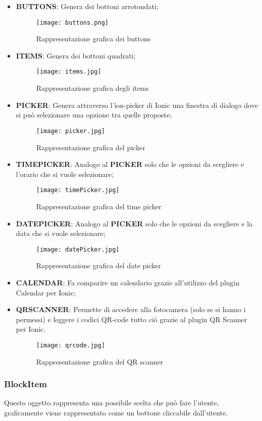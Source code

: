 \begin{itemize}
	\item \textbf{BUTTONS}: Genera dei bottoni arrotondati;
	\begin{figure}[h]
		\centering
		\texttt{[image: buttons.png]}
	\caption{Rappresentazione grafica dei buttons}
	\end{figure}
	\clearpage
	\item \textbf{ITEMS}: Genera dei bottoni quadrati;
	\begin{figure}[h]
		\centering
		\texttt{[image: items.jpg]}
		\caption{Rappresentazione grafica degli items}
	\end{figure}
	\item \textbf{PICKER}: Genera attraverso l'ion-picker di \textsf{Ionic} una finestra di dialogo dove si può selezionare una opzione tra quelle proposte;
	\begin{figure}[h]
		\centering
		\texttt{[image: picker.jpg]}
		\caption{Rappresentazione grafica del picker}
	\end{figure}
	\item \textbf{TIMEPICKER}: Analogo al \textbf{PICKER} solo che le opzioni da scegliere e l'orario che si vuole selezionare;
	\begin{figure}[h]
		\centering
		\texttt{[image: timePicker.jpg]}
		\caption{Rappresentazione grafica del time picker}
	\end{figure}
\clearpage
	\item \textbf{DATEPICKER}: Analogo al \textbf{PICKER} solo che le opzioni da scegliere e la data che si vuole selezionare;
	\begin{figure}[h]
		\centering
		\texttt{[image: datePicker.jpg]}
		\caption{Rappresentazione grafica del date picker}
	\end{figure}
	\item \textbf{CALENDAR}: Fa comparire un calendario grazie all'utilizzo del plugin Calendar per Ionic;
	\item \textbf{QRSCANNER}: Permette di accedere alla fotocamera (solo se si hanno i permessi) e leggere i codici \textsf{QR-code} tutto ciò grazie al plugin QR Scanner per Ionic.
	\begin{figure}[h]
		\centering
		\texttt{[image: qrcode.jpg]}
		\caption{Rappresentazione grafica del QR scanner}
	\end{figure}
\end{itemize}

\subsubsection*{BlockItem}
Questo oggetto rappresenta una possibile scelta che può fare l'utente, graficamente viene rappresentato come un bottone cliccabile dall'utente.

